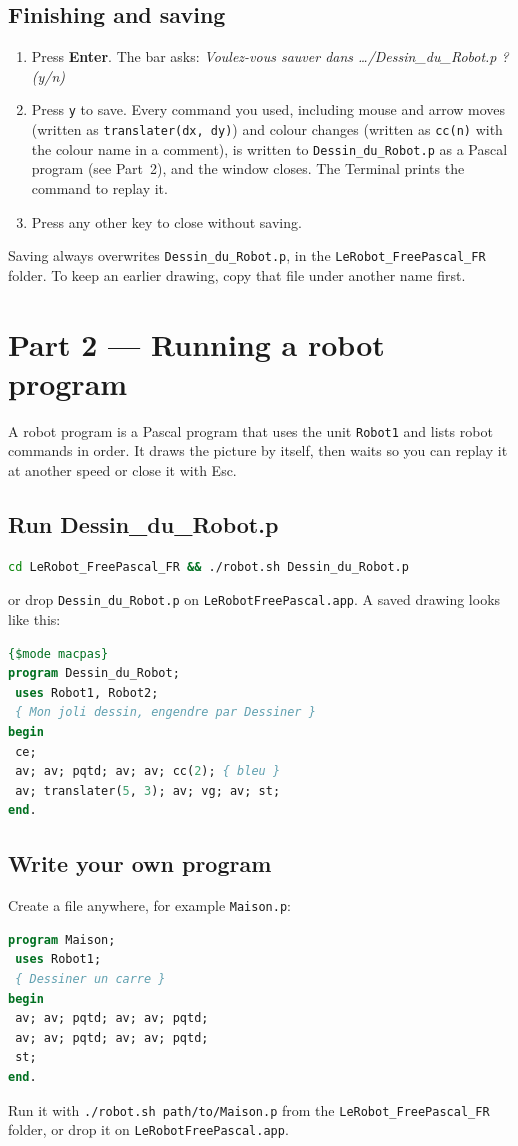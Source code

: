 \documentclass[11pt,a4paper]{article}
\newcommand{\kbd}[1]{\texttt{#1}}
\begin{document}
\subsection{Finishing and saving}
\begin{enumerate}
\item Press \textbf{Enter}. The bar asks:
  \emph{Voulez-vous sauver dans \dots/Dessin\_du\_Robot.p ? (y/n)}
\item Press \kbd{y} to save. Every command you used, including mouse and
  arrow moves (written as \kbd{translater(dx, dy)}) and colour changes
  (written as \kbd{cc(n)} with the colour name in a comment), is written to
  \kbd{Dessin\_du\_Robot.p} as a Pascal program (see Part~2), and the
  window closes. The Terminal prints the command to replay it.
\item Press any other key to close without saving.
\end{enumerate}
Saving always overwrites \kbd{Dessin\_du\_Robot.p}, in the
\kbd{LeRobot\_FreePascal\_FR} folder. To keep an earlier drawing, copy that
file under another name first.

\section{Part 2 --- Running a robot program}

A robot program is a Pascal program that uses the unit \kbd{Robot1} and
lists robot commands in order. It draws the picture by itself, then waits
so you can replay it at another speed or close it with Esc.

\subsection{Run Dessin\_du\_Robot.p}
\begin{lstlisting}[language=bash]
cd LeRobot_FreePascal_FR && ./robot.sh Dessin_du_Robot.p
\end{lstlisting}
or drop \kbd{Dessin\_du\_Robot.p} on \kbd{LeRobotFreePascal.app}. A saved
drawing looks like this:
\begin{lstlisting}[language=Pascal]
{$mode macpas}
program Dessin_du_Robot;
 uses Robot1, Robot2;
 { Mon joli dessin, engendre par Dessiner }
begin
 ce;
 av; av; pqtd; av; av; cc(2); { bleu }
 av; translater(5, 3); av; vg; av; st;
end.
\end{lstlisting}

\subsection{Write your own program}
Create a file anywhere, for example \kbd{Maison.p}:
\begin{lstlisting}[language=Pascal]
program Maison;
 uses Robot1;
 { Dessiner un carre }
begin
 av; av; pqtd; av; av; pqtd;
 av; av; pqtd; av; av; pqtd;
 st;
end.
\end{lstlisting}
Run it with \kbd{./robot.sh path/to/Maison.p} from the
\kbd{LeRobot\_FreePascal\_FR} folder, or drop it on \kbd{LeRobotFreePascal.app}.
\end{document}
